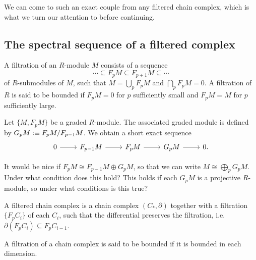 \documentclass{article}
\begin{document}
We can come to such an exact couple from any filtered chain complex, which is
what we turn our attention to before continuing.

\subsection{The spectral sequence of a filtered complex}

\begin{defn}
A filtration of an $R$-module $M$ consists of a sequence
\begin{equation*}
\cdots\subseteq F_pM\subseteq F_{p+1}M\subseteq\cdots
\end{equation*}
of $R$-submodules of $M$, such that $M=\bigcup_p F_pM$ and $\bigcap_p F_pM=0$. 
A filtration of $R$ is said to be bounded if $F_pM=0$ for $p$ sufficiently
small and $F_pM=M$ for $p$ sufficiently large.
\end{defn}

\begin{defn}
Let $\{M,F_pM\}$ be a graded $R$-module. The associated graded module is defined
by $G_p M\vcentcolon\equiv F_pM/F_{p-1}M$. We obtain a short exact sequence
\begin{equation*}
\begin{tikzcd}
0 \arrow[r] & F_{p-1}M \arrow[r] & F_pM \arrow[r] & G_pM \arrow[r] & 0.
\end{tikzcd}
\end{equation*}
\end{defn}

\begin{rmk}
It would be nice if $F_pM\cong F_{p-1}M\oplus G_pM$, so that we can write
$M\cong\bigoplus_p G_pM$. Under what condition does this hold? This holds if
each $G_pM$ is a projective $R$-module, so under what conditions is this true?
\end{rmk}

\begin{defn}
A filtered chain complex is a chain complex $(C_\ast,\partial)$ together with a
filtration $\{F_pC_i\}$ of each $C_i$, such that the differential preserves the
filtration, i.e.~$\partial(F_pC_i)\subseteq F_p C_{i-1}$. 

A filtration of a chain complex is said to be bounded if it is bounded in each
dimension.
\end{defn}
\end{document}
